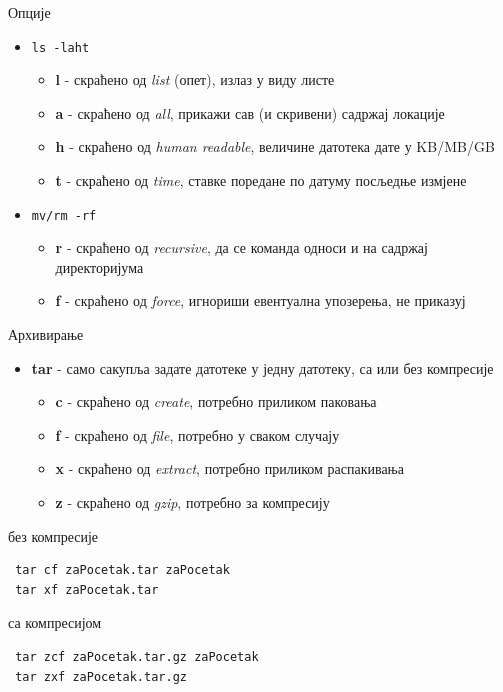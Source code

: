 \documentclass{beamer}
\begin{document}
\begin{frame}{Опције}
\begin{itemize}
    \item \texttt{ls -laht}
    \begin{itemize}
        \item \textbf{l} - скраћено од \textit{list} (опет), излаз у виду листе
        \item \textbf{a} - скраћено од \textit{all}, прикажи сав (и скривени) садржај локације
        \item \textbf{h} - скраћено од \textit{human readable}, величине датотека дате у KB/MB/GB
        \item \textbf{t} - скраћено од \textit{time}, ставке поредане по датуму посљедње измјене
    \end{itemize}
    \item \texttt{mv/rm -rf}
    \begin{itemize}
        \item \textbf{r} - скраћено од \textit{recursive}, да се команда односи и на садржај директоријума
        \item \textbf{f} - скраћено од \textit{force}, игнориши евентуална упозерења, не приказуј
    \end{itemize}
\end{itemize}
\end{frame}

\begin{frame}[fragile]{Архивирање}
\begin{itemize}
    \item \textbf{tar} - само сакупља задате датотеке у једну датотеку, са или без компресије
    \begin{itemize}
        \item \textbf{c} - скраћено од \textit{create}, потребно приликом паковања
        \item \textbf{f} - скраћено од \textit{file}, потребно у сваком случају
        \item \textbf{x} - скраћено од \textit{extract}, потребно приликом распакивања
        \item \textbf{z} - скраћено од \textit{gzip}, потребно за компресију
    \end{itemize}
\end{itemize}

\begin{block}{без компресије}
 \begin{lstlisting}
 tar cf zaPocetak.tar zaPocetak
 tar xf zaPocetak.tar

 \end{lstlisting}
    \end{block}

\begin{block}{са компресијом}
 \begin{lstlisting}
 tar zcf zaPocetak.tar.gz zaPocetak
 tar zxf zaPocetak.tar.gz
 \end{lstlisting}
    \end{block}

\end{frame}
\end{document}
